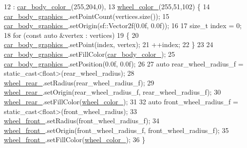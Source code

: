 \begin{DoxyCode}
12                                                                               : 
      \hyperlink{classCarGraphics_a3df8d600a272817a5c521cdc8c23c587}{car\_body\_color\_}(255,204,0),
13                                                                                 
      \hyperlink{classCarGraphics_adc369f5f948025767d40f2ad40e2568a}{wheel\_color\_}(255,51,102) \{
14     \hyperlink{classCarGraphics_a4e1969ef5f4326f10b83b1488484f660}{car\_body\_graphics\_}.setPointCount(vertices.size());
15     \hyperlink{classCarGraphics_a4e1969ef5f4326f10b83b1488484f660}{car\_body\_graphics\_}.setOrigin(sf::Vector2f(0.0f, 0.0f));
16 
17     \textcolor{keywordtype}{size\_t} index = 0;
18     \textcolor{keywordflow}{for} (\textcolor{keyword}{const} \textcolor{keyword}{auto} &vertex : vertices)
19     \{
20         \hyperlink{classCarGraphics_a4e1969ef5f4326f10b83b1488484f660}{car\_body\_graphics\_}.setPoint(index, vertex);
21         ++index;
22     \}
23 
24     \hyperlink{classCarGraphics_a4e1969ef5f4326f10b83b1488484f660}{car\_body\_graphics\_}.setFillColor(\hyperlink{classCarGraphics_a3df8d600a272817a5c521cdc8c23c587}{car\_body\_color\_});
25     \hyperlink{classCarGraphics_a4e1969ef5f4326f10b83b1488484f660}{car\_body\_graphics\_}.setPosition(0.0f, 0.0f);
26 
27     \textcolor{keyword}{auto} rear\_wheel\_radius\_f = \textcolor{keyword}{static\_cast<}\textcolor{keywordtype}{float}\textcolor{keyword}{>}(rear\_wheel\_radius);
28     \hyperlink{classCarGraphics_a2a66d0c60b79f54a807a31afd76c4ad1}{wheel\_rear\_}.setRadius(rear\_wheel\_radius\_f);
29     \hyperlink{classCarGraphics_a2a66d0c60b79f54a807a31afd76c4ad1}{wheel\_rear\_}.setOrigin(rear\_wheel\_radius\_f, rear\_wheel\_radius\_f);
30     \hyperlink{classCarGraphics_a2a66d0c60b79f54a807a31afd76c4ad1}{wheel\_rear\_}.setFillColor(\hyperlink{classCarGraphics_adc369f5f948025767d40f2ad40e2568a}{wheel\_color\_});
31 
32     \textcolor{keyword}{auto} front\_wheel\_radius\_f = \textcolor{keyword}{static\_cast<}\textcolor{keywordtype}{float}\textcolor{keyword}{>}(front\_wheel\_radius);
33     \hyperlink{classCarGraphics_a2e004e7f0288f6ed1352ba9116b4d112}{wheel\_front\_}.setRadius(front\_wheel\_radius\_f);
34     \hyperlink{classCarGraphics_a2e004e7f0288f6ed1352ba9116b4d112}{wheel\_front\_}.setOrigin(front\_wheel\_radius\_f, front\_wheel\_radius\_f);
35     \hyperlink{classCarGraphics_a2e004e7f0288f6ed1352ba9116b4d112}{wheel\_front\_}.setFillColor(\hyperlink{classCarGraphics_adc369f5f948025767d40f2ad40e2568a}{wheel\_color\_});
36 \}
\end{DoxyCode}


